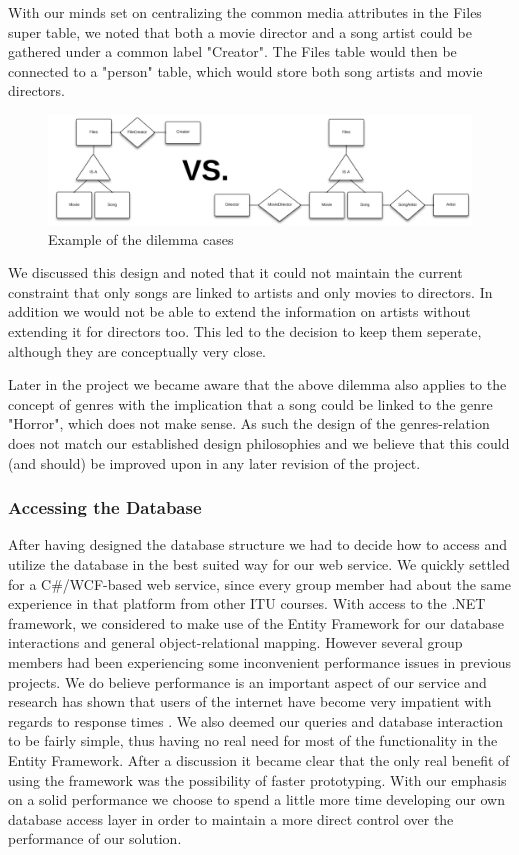 With our minds set on centralizing the common media attributes in the Files super table, we noted that both a movie director and a song artist could be gathered under a common label "Creator". The Files table would then be connected to a "person" table, which would store both song artists and movie directors.
\begin{figure}[hbt]
	\centering
	\centerline{\includegraphics[scale=0.52]{./p1design/dilemma.png}}
	\caption{Example of the dilemma cases}
	\label{fig:erddilemma}
\end{figure}

We discussed this design and noted that it could not maintain the current constraint that only songs are linked to artists and only movies to directors. In addition we would not be able to extend the information on artists without extending it for directors too. This led to the decision to keep them seperate, although they are conceptually very close.

Later in the project we became aware that the above dilemma also applies to the concept of genres with the implication that a song could be linked to the genre "Horror", which does not make sense. As such the design of the genres-relation does not match our established design philosophies and we believe that this could (and should) be improved upon in any later revision of the project.

\subsubsection{Accessing the Database}
\label{sec:databaseaccess}
After having designed the database structure we had to decide how to access and utilize the database in the best suited way for our web service. We quickly settled for a C\#/WCF-based web service, since every group member had about the same experience in that platform from other ITU courses.
With access to the .NET framework, we considered to make use of the Entity Framework for our database interactions and general object-relational mapping. However several group members had been experiencing some inconvenient performance issues in previous projects. We do believe performance is an important aspect of our service and research has shown that users of the internet have become very impatient with regards to response times \cite{webusersflee}. We also deemed our queries and database interaction to be fairly simple, thus having no real need for most of the functionality in the Entity Framework. After a discussion it became clear that the only real benefit of using the framework was the possibility of faster prototyping. With our emphasis on a solid performance we choose to spend a little more time developing our own database access layer in order to maintain a more direct control over the performance of our solution.


